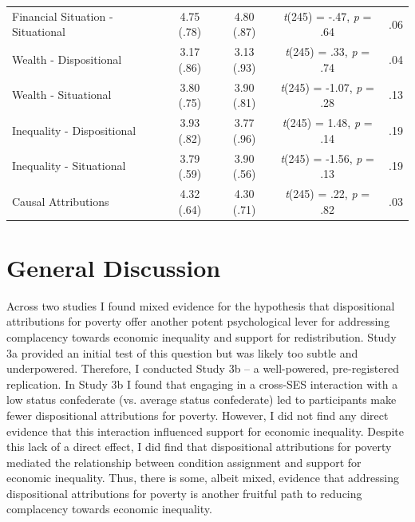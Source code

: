 \documentclass{sfuthesis}
\begin{document}
\begin{table}[h]
\begin{center}
\begin{tabular}{l c c c c}
      Financial Situation - Situational & \multicolumn{1}{c}{4.75 (.78)} & \multicolumn{1}{c}{4.80 (.87)} & \multicolumn{1}{c}{\textit{t}(245) = -.47, \textit{p} = .64} & .06\\
      Wealth - Dispositional & \multicolumn{1}{c}{3.17 (.86)} & \multicolumn{1}{c}{3.13 (.93)} & \multicolumn{1}{c}{\textit{t}(245) = .33, \textit{p} = .74} & .04\\
      Wealth - Situational & \multicolumn{1}{c}{3.80 (.75)} & \multicolumn{1}{c}{3.90 (.81)} & \multicolumn{1}{c}{\textit{t}(245) = -1.07, \textit{p} = .28} & .13\\
      Inequality - Dispositional & \multicolumn{1}{c}{3.93 (.82)} & \multicolumn{1}{c}{3.77 (.96)} & \multicolumn{1}{c}{\textit{t}(245) = 1.48, \textit{p} = .14} & .19\\
      Inequality - Situational & \multicolumn{1}{c}{3.79 (.59)} & \multicolumn{1}{c}{3.90 (.56)} & \multicolumn{1}{c}{\textit{t}(245) = -1.56, \textit{p} = .13} & .19\\
      Causal Attributions & \multicolumn{1}{c}{4.32 (.64)} & \multicolumn{1}{c}{4.30 (.71)} & \multicolumn{1}{c}{\textit{t}(245) = .22, \textit{p} = .82} & .03\\
      \hline
    \end{tabular}
  \end{center}
\end{table}

\section{General Discussion}

Across two studies I found mixed evidence for the hypothesis that dispositional attributions for poverty offer another potent psychological lever for addressing complacency towards economic inequality and support for redistribution. Study 3a provided an initial test of this question but was likely too subtle and underpowered. Therefore, I conducted Study 3b – a well-powered, pre-registered replication. In Study 3b I found that engaging in a cross-SES interaction with a low status confederate (vs. average status confederate) led to participants make fewer dispositional attributions for poverty. However, I did not find any direct evidence that this interaction influenced support for economic inequality. Despite this lack of a direct effect, I did find that dispositional attributions for poverty mediated the relationship between condition assignment and support for economic inequality. Thus, there is some, albeit mixed, evidence that addressing dispositional attributions for poverty is another fruitful path to reducing complacency towards economic inequality.
\end{document}
